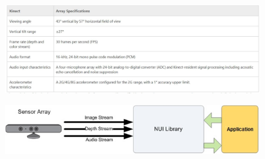 \begin{figure}[h]
\centering
\begin{minipage}{7.0cm}
    \centering
    \label{fig:1}
\end{minipage}
\begin{minipage}{7.0cm}
    \centering
    \label{fig:2}
\end{minipage}
\end{figure}


\begin{figure}[h]
    \centering
    \includegraphics[height=0.25\textheight]{fig02/kinspecs.jpg}
    \label{fig:kinect}
\end{figure}
\begin{figure}[h]
    \centering
    \includegraphics[height=0.15\textheight]{fig02/pipeline}
    \label{fig:kinect}
\end{figure}

